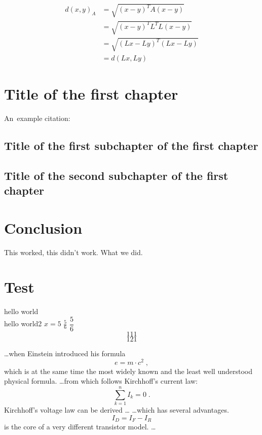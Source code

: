 \documentclass[12pt,a4paper]{report}
\begin{document}
\begin{align*}
  d(x,y)_{A} &= \sqrt{(x-y)^{T}A(x-y)} \\
         &= \sqrt{(x-y)^{T}L^{T}L(x-y)} \\
         &= \sqrt{(Lx-Ly)^{T}(Lx-Ly)} \\
         &= d(Lx, Ly)
\end{align*}


\chapter{Title of the first chapter}

An~example citation: \cite{Andel07}

\section{Title of the first subchapter of the first chapter}

\section{Title of the second subchapter of the first chapter}


\chapter*{Conclusion}

This worked, this didn't work. What we did.


\chapter*{Test}
hello world \\ hello world2
$x=5$
$\frac{5}{6}$
$\dfrac{5}{6}$
\[111\]
$$121$$


\ldots when Einstein introduced his formula
\begin{equation}
e = m \cdot c^2 \; ,
\end{equation}
which is at the same time the most widely known
and the least well understood physical formula.
\ldots from which follows Kirchhoff’s current law:
\begin{equation}
\sum_{k=1}^{n} I_k = 0 \; .
\end{equation}
Kirchhoff’s voltage law can be derived \ldots
\ldots which has several advantages.
\begin{equation}
I_D = I_F - I_R
\end{equation}
is the core of a very different transistor model. \ldots
\end{document}

